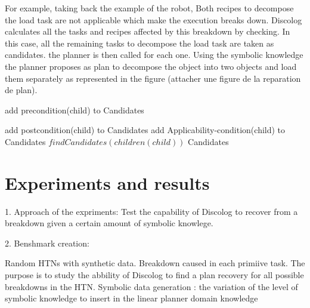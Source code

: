 \documentclass[conference]{IEEEtran}
\begin{document}
		\par For example, taking back the example of the robot, Both recipes to decompose the load task are not applicable which make the execution breaks down. Discolog calculates all the tasks and recipes affected by this breakdown by checking. In this case, all the remaining tasks to decompose the load task are taken as candidates. the planner is then called for each one. Using the symbolic knowledge the planner proposes as plan to decompose the object into two objects and load them separately as represented in the figure (attacher une figure de la reparation de plan). 
		\label{findCandidates}
		\begin{algorithm}
			
			\begin{algorithmic}[]
				\State add precondition(child) to Candidates
				
				\State add postcondition(child) to Candidates
				\EndIf
				\State add Applicability-condition(child) to Candidates
				\EndIf
				\State $\textit{findCandidates} (children(child))$
				\EndFor
				\Return Candidates
				
				\EndProcedure 
			\end{algorithmic}
		\end{algorithm}
		
		\section{Experiments and results}
		
		
		1. Approach of the expriments: Test the capability of Discolog to recover from a breakdown given a certain amount of symbolic knowlege. 
		
		
		2. Benshmark creation:  
		
		Random HTNs with synthetic data. Breakdown caused in each primiive task. The purpose is to study the abbility of Discolog to find a plan recovery for all possible breakdowns in the HTN. 
		Symbolic data generation : the variation of the level of symbolic knowledge to insert in the linear planner domain knowledge
		
\end{document}
